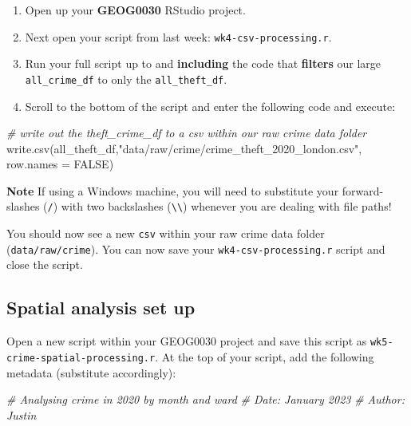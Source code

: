 \documentclass[
]{book}
\newenvironment{Shaded}{\begin{snugshade}}{\end{snugshade}}
\newcommand{\AttributeTok}[1]{\textcolor[rgb]{0.77,0.63,0.00}{#1}}
\newcommand{\CommentTok}[1]{\textcolor[rgb]{0.56,0.35,0.01}{\textit{#1}}}
\newcommand{\ConstantTok}[1]{\textcolor[rgb]{0.00,0.00,0.00}{#1}}
\newcommand{\FunctionTok}[1]{\textcolor[rgb]{0.00,0.00,0.00}{#1}}
\newcommand{\NormalTok}[1]{#1}
\newcommand{\StringTok}[1]{\textcolor[rgb]{0.31,0.60,0.02}{#1}}
\providecommand{\tightlist}{%
  \setlength{\itemsep}{0pt}\setlength{\parskip}{0pt}}
\begin{document}
\begin{enumerate}
\def\labelenumi{\arabic{enumi}.}
\tightlist
\item
  Open up your \textbf{GEOG0030} RStudio project.
\item
  Next open your script from last week: \texttt{wk4-csv-processing.r}.
\item
  Run your full script up to and \textbf{including} the code that \textbf{filters} our large \texttt{all\_crime\_df} to only the \texttt{all\_theft\_df}.
\item
  Scroll to the bottom of the script and enter the following code and execute:
\end{enumerate}

\begin{Shaded}
\begin{Highlighting}[]
\CommentTok{\# write out the theft\_crime\_df to a csv within our raw crime data folder}
\FunctionTok{write.csv}\NormalTok{(all\_theft\_df,}\StringTok{"data/raw/crime/crime\_theft\_2020\_london.csv"}\NormalTok{, }\AttributeTok{row.names =} \ConstantTok{FALSE}\NormalTok{)}
\end{Highlighting}
\end{Shaded}

\textbf{Note}
If using a Windows machine, you will need to substitute your forward-slashes (\texttt{/}) with two backslashes (\texttt{\textbackslash{}\textbackslash{}}) whenever you are dealing with file paths!

You should now see a new \texttt{csv} within your raw crime data folder (\texttt{data/raw/crime}). You can now save your \texttt{wk4-csv-processing.r} script and close the script.

\hypertarget{spatial-analysis-set-up}{%
\subsection{Spatial analysis set up}\label{spatial-analysis-set-up}}

Open a new script within your GEOG0030 project and save this script as \texttt{wk5-crime-spatial-processing.r}. At the top of your script, add the following metadata (substitute accordingly):

\begin{Shaded}
\begin{Highlighting}[]
\CommentTok{\# Analysing crime in 2020 by month and ward}
\CommentTok{\# Date: January 2023}
\CommentTok{\# Author: Justin }
\end{Highlighting}
\end{Shaded}
\end{document}
